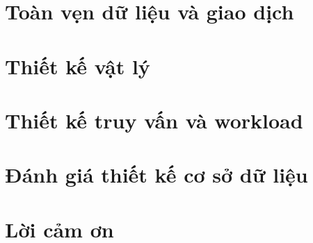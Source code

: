 \documentclass[letterpaper,11pt,leqno]{book}
\begin{document}
\chapter{Toàn vẹn dữ liệu và giao dịch}


\chapter{Thiết kế vật lý}


\chapter{Thiết kế truy vấn và workload}


\chapter{Đánh giá thiết kế cơ sở dữ liệu}


\chapter{Lời cảm ơn}

\end{document}
